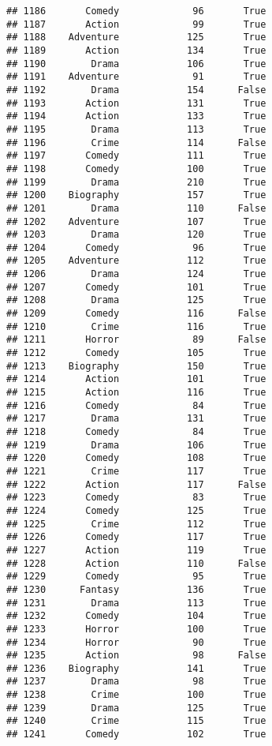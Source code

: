 \documentclass[
]{article}
\begin{document}
\begin{verbatim}
## 1186       Comedy             96       True
## 1187       Action             99       True
## 1188    Adventure            125       True
## 1189       Action            134       True
## 1190        Drama            106       True
## 1191    Adventure             91       True
## 1192        Drama            154      False
## 1193       Action            131       True
## 1194       Action            133       True
## 1195        Drama            113       True
## 1196        Crime            114      False
## 1197       Comedy            111       True
## 1198       Comedy            100       True
## 1199        Drama            210       True
## 1200    Biography            157       True
## 1201        Drama            110      False
## 1202    Adventure            107       True
## 1203        Drama            120       True
## 1204       Comedy             96       True
## 1205    Adventure            112       True
## 1206        Drama            124       True
## 1207       Comedy            101       True
## 1208        Drama            125       True
## 1209       Comedy            116      False
## 1210        Crime            116       True
## 1211       Horror             89      False
## 1212       Comedy            105       True
## 1213    Biography            150       True
## 1214       Action            101       True
## 1215       Action            116       True
## 1216       Comedy             84       True
## 1217        Drama            131       True
## 1218       Comedy             84       True
## 1219        Drama            106       True
## 1220       Comedy            108       True
## 1221        Crime            117       True
## 1222       Action            117      False
## 1223       Comedy             83       True
## 1224       Comedy            125       True
## 1225        Crime            112       True
## 1226       Comedy            117       True
## 1227       Action            119       True
## 1228       Action            110      False
## 1229       Comedy             95       True
## 1230      Fantasy            136       True
## 1231        Drama            113       True
## 1232       Comedy            104       True
## 1233       Horror            100       True
## 1234       Horror             90       True
## 1235       Action             98      False
## 1236    Biography            141       True
## 1237        Drama             98       True
## 1238        Crime            100       True
## 1239        Drama            125       True
## 1240        Crime            115       True
## 1241       Comedy            102       True

\end{verbatim}
\end{document}
